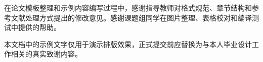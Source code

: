 \begin{njustthanks}
在论文模板整理和示例内容编写过程中，感谢指导教师对格式规范、章节结构和参考文献处理方式提出的修改意见。感谢课题组同学在图片整理、表格校对和编译测试中提供的帮助。

本文档中的示例文字仅用于演示排版效果，正式提交前应替换为与本人毕业设计工作相关的真实致谢内容。
\end{njustthanks}
